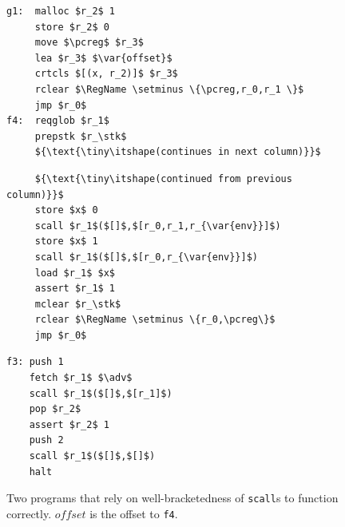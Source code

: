 \documentclass[format=acmsmall, review=false, screen=true]{acmart}
\newcommand{\var}[1]{\mathit{#1}}
\newcommand{\pcreg}{\mathrm{pc}}
\newcommand{\adv}{\var{adv}}
\newcommand{\stk}{\var{stk}}
\newcommand{\plaindom}[1]{\mathrm{#1}}
\newcommand{\RegName}{\plaindom{RegName}}
\begin{document}

\begin{figure}[t]
  \centering
  \begin{minipage}[t]{.37\linewidth}
  \begin{lstlisting}
g1:  malloc $r_2$ 1
     store $r_2$ 0
     move $\pcreg$ $r_3$
     lea $r_3$ $\var{offset}$
     crtcls $[(x, r_2)]$ $r_3$
     rclear $\RegName \setminus \{\pcreg,r_0,r_1 \}$
     jmp $r_0$
f4:  reqglob $r_1$
     prepstk $r_\stk$
     ${\text{\tiny\itshape(continues in next column)}}$
\end{lstlisting}
  \end{minipage}%
  \begin{minipage}[t]{.37\linewidth}
\begin{lstlisting}
     ${\text{\tiny\itshape(continued from previous column)}}$
     store $x$ 0
     scall $r_1$($[]$,$[r_0,r_1,r_{\var{env}}]$)
     store $x$ 1
     scall $r_1$($[]$,$[r_0,r_{\var{env}}]$)
     load $r_1$ $x$
     assert $r_1$ 1
     mclear $r_\stk$
     rclear $\RegName \setminus \{r_0,\pcreg\}$
     jmp $r_0$
\end{lstlisting}
  \end{minipage}%
  \begin{minipage}[t]{.25\linewidth}
  \begin{lstlisting}
f3: push 1
    fetch $r_1$ $\adv$
    scall $r_1$($[]$,$[r_1]$)
    pop $r_2$
    assert $r_2$ 1
    push 2
    scall $r_1$($[]$,$[]$)
    halt
\end{lstlisting}
  \end{minipage}
  \caption{ Two programs that rely on well-bracketedness of
    \texttt{scall}s to function correctly. $\var{offset}$ is the
    offset to \texttt{f4}.}
  \label{fig:prog-f3-and-g1}
\end{figure}
\end{document}
